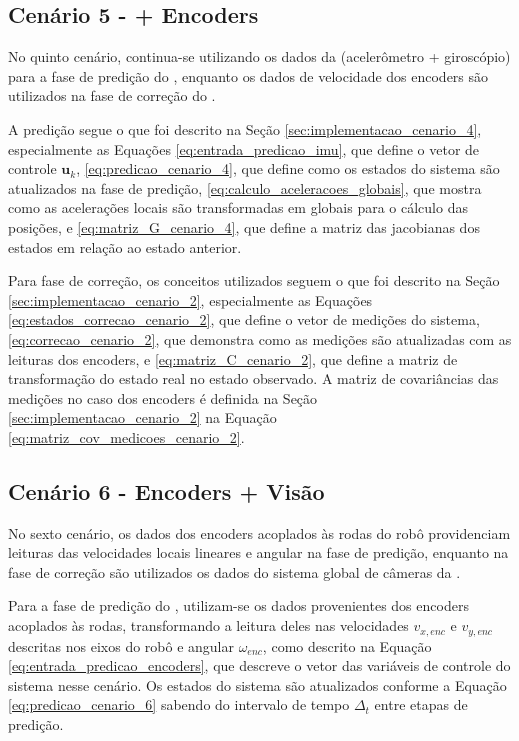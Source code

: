 \documentclass[acronym, symbols, table, deposito]{fei}
\begin{document}
		\subsection{Cenário 5 -  + Encoders} \label{sec:implementacao_cenario_5}
			
			No quinto cenário, continua-se utilizando os dados da  (acelerômetro + giroscópio) para a fase de predição do , enquanto os dados de velocidade dos encoders são utilizados na fase de correção do .
			
			A predição segue o que foi descrito na Seção \ref{sec:implementacao_cenario_4}, especialmente as Equações \eqref{eq:entrada_predicao_imu}, que define o vetor de controle $\textbf{u}_k$, \eqref{eq:predicao_cenario_4}, que define como os estados do sistema são atualizados na fase de predição, \eqref{eq:calculo_aceleracoes_globais}, que mostra como as acelerações locais são transformadas em globais para o cálculo das posições, e \eqref{eq:matriz_G_cenario_4}, que define a matriz das jacobianas dos estados em relação ao estado anterior.
	
			Para fase de correção, os conceitos utilizados seguem o que foi descrito na Seção \ref{sec:implementacao_cenario_2}, especialmente as Equações \eqref{eq:estados_correcao_cenario_2}, que define o vetor de medições do sistema, \eqref{eq:correcao_cenario_2}, que demonstra como as medições são atualizadas com as leituras dos encoders, e \eqref{eq:matriz_C_cenario_2}, que define a matriz de transformação do estado real no estado observado. A matriz de covariâncias das medições no caso dos encoders é definida na Seção \ref{sec:implementacao_cenario_2} na Equação \eqref{eq:matriz_cov_medicoes_cenario_2}.
			
		\subsection{Cenário 6 - Encoders + Visão} \label{sec:implementacao_cenario_6}
			
			No sexto cenário, os dados dos encoders acoplados às rodas do robô providenciam leituras das velocidades locais lineares e angular na fase de predição, enquanto na fase de correção são utilizados os dados do sistema global de câmeras da .
			
			Para a fase de predição do , utilizam-se os dados provenientes dos encoders acoplados às rodas, transformando a leitura deles nas velocidades $v_{x,enc}$ e $v_{y,enc}$ descritas nos eixos do robô e angular $\omega_{enc}$, como descrito na Equação \eqref{eq:entrada_predicao_encoders}, que descreve o vetor das variáveis de controle do sistema nesse cenário. Os estados do sistema são atualizados conforme a Equação \eqref{eq:predicao_cenario_6} sabendo do intervalo de tempo $\Delta_t$ entre etapas de predição.
			
\end{document}
